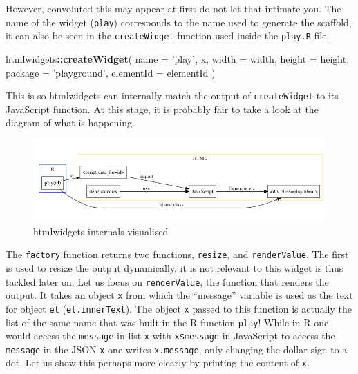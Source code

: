 \documentclass[10pt,]{krantz}
\makeatletter
\newenvironment{Shaded}{\begin{snugshade}}{\end{snugshade}}
\newcommand{\DataTypeTok}[1]{\textcolor[rgb]{0.27,0.27,0.27}{#1}}
\newcommand{\KeywordTok}[1]{\textcolor[rgb]{0.27,0.27,0.27}{\textbf{#1}}}
\newcommand{\NormalTok}[1]{#1}
\newcommand{\OperatorTok}[1]{\textcolor[rgb]{0.43,0.43,0.43}{\textbf{#1}}}
\newcommand{\StringTok}[1]{\textcolor[rgb]{0.5,0.5,0.5}{#1}}
\newenvironment{kframe}{%
\medskip{}
\setlength{\fboxsep}{.8em}
 \def\at@end@of@kframe{}%
 \ifinner\ifhmode%
  \def\at@end@of@kframe{\end{minipage}}%
  \begin{minipage}{\columnwidth}%
 \fi\fi%
 \def\FrameCommand##1{\hskip\@totalleftmargin \hskip-\fboxsep
 \colorbox{shadecolor}{##1}\hskip-\fboxsep
     \hskip-\linewidth \hskip-\@totalleftmargin \hskip\columnwidth}%
 \MakeFramed {\advance\hsize-\width
   \@totalleftmargin\z@ \linewidth\hsize
   \@setminipage}}%
 {\par\unskip\endMakeFramed%
 \at@end@of@kframe}
\renewenvironment{Shaded}{\begin{kframe}}{\end{kframe}}
\makeatother
\begin{document}
However, convoluted this may appear at first do not let that intimate you. The name of the widget (\texttt{play}) corresponds to the name used to generate the scaffold, it can also be seen in the \texttt{createWidget} function used inside the \texttt{play.R} file.

\begin{Shaded}
\begin{Highlighting}[]
\NormalTok{htmlwidgets}\OperatorTok{::}\KeywordTok{createWidget}\NormalTok{(}
  \DataTypeTok{name =} \StringTok{'play'}\NormalTok{,}
\NormalTok{  x,}
  \DataTypeTok{width =}\NormalTok{ width,}
  \DataTypeTok{height =}\NormalTok{ height,}
  \DataTypeTok{package =} \StringTok{'playground'}\NormalTok{,}
  \DataTypeTok{elementId =}\NormalTok{ elementId}
\NormalTok{)}
\end{Highlighting}
\end{Shaded}

This is so htmlwidgets can internally match the output of \texttt{createWidget} to its JavaScript function. At this stage, it is probably fair to take a look at the diagram of what is happening.

\begin{figure}[H]

{\centering \includegraphics[width=1\linewidth]{images/03-htmlwidgets-internals} 

}

\caption{htmlwidgets internals visualised}\label{fig:widget-internals-diagram}
\end{figure}

The \texttt{factory} function returns two functions, \texttt{resize}, and \texttt{renderValue}. The first is used to resize the output dynamically, it is not relevant to this widget is thus tackled later on. Let us focus on \texttt{renderValue}, the function that renders the output. It takes an object \texttt{x} from which the ``message'' variable is used as the text for object \texttt{el} (\texttt{el.innerText}). The object \texttt{x} passed to this function is actually the list of the same name that was built in the R function \texttt{play}! While in R one would access the \texttt{message} in list \texttt{x} with \texttt{x\$message} in JavaScript to access the \texttt{message} in the JSON \texttt{x} one writes \texttt{x.message}, only changing the dollar sign to a dot. Let us show this perhaps more clearly by printing the content of \texttt{x}.
\end{document}
